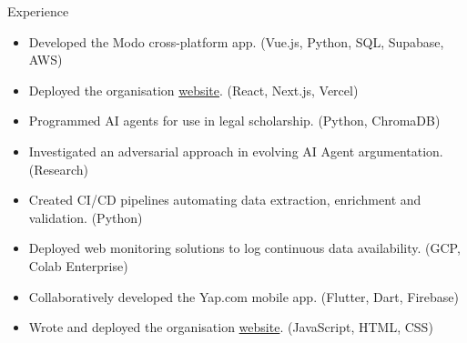
\begin{experienceSection}{Experience}

    \experienceItem[
        company={The Modo Collective},
        location={Singapore},
        position={Founder \& Lead Developer},
        duration={Jan. 2025 - Aug. 2025}
    ]
    \begin{itemize}
        \itemsep -6pt {}
        \item Developed the Modo cross-platform app. (Vue.js, Python, SQL, Supabase, AWS)
        \item Deployed the organisation \href{https://modo-com.vercel.app/}{website}. (React, Next.js, Vercel)
    \end{itemize}

    \experienceItem[
        company={SMU Yong Pung How School of Law},
        location={Singapore},
        position={Research Assistant},
        duration={Jan. 2025 - Apr. 2025}
    ]
    \begin{itemize}
        \itemsep -6pt {}
        \item Programmed AI agents for use in legal scholarship. (Python, ChromaDB)
        \item Investigated an adversarial approach in evolving AI Agent argumentation. (Research)
    \end{itemize}

    \experienceItem[
        company={Elefant},
        location={Singapore},
        position={Backend Development Intern},
        duration={Sep. 2024 - Dec. 2024}
    ]
    \begin{itemize}
        \itemsep -6pt {}
        \item Created CI/CD pipelines automating data extraction, enrichment and validation. (Python)
        \item Deployed web monitoring solutions to log continuous data availability. (GCP, Colab Enterprise)
    \end{itemize}

    \experienceItem[
        company={The Yap Labs},
        location={Singapore},
        position={Co-founder \& Tech Development Head},
        duration={Apr. 2024 - Aug. 2024}
    ]
    \begin{itemize}
        \itemsep -6pt {}
        \item Collaboratively developed the Yap.com mobile app. (Flutter, Dart, Firebase)
        \item Wrote and deployed the organisation \href{https://the-yap-labs.github.io/}{website}. (JavaScript, HTML, CSS)
    \end{itemize}

\end{experienceSection}

